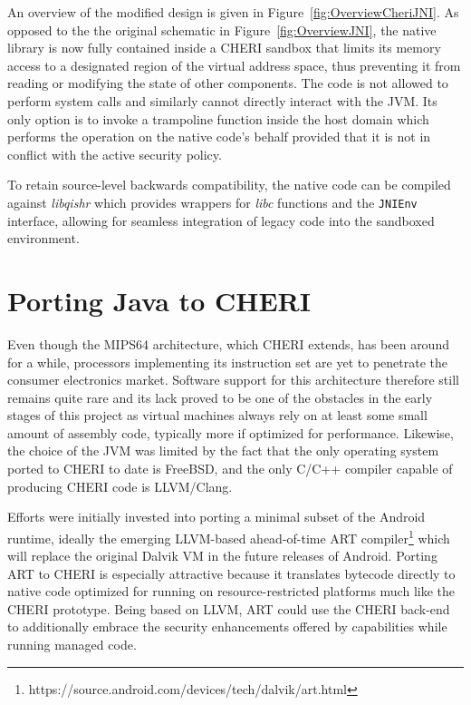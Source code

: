 \documentclass[a4paper,12pt,twoside,openright]{report}
\newcommand{\tool}[1]{\emph{#1}}
\newcommand{\lib}[1]{\tool{lib#1}}
\begin{document}
An overview of the modified design is given in Figure~\ref{fig:OverviewCheriJNI}. As opposed to the the original schematic in Figure~\ref{fig:OverviewJNI}, the native library is now fully contained inside a CHERI sandbox that limits its memory access to a designated region of the virtual address space, thus preventing it from reading or modifying the state of other components. The code is not allowed to perform system calls and similarly cannot directly interact with the JVM. Its only option is to invoke a trampoline function inside the host domain which performs the operation on the native code's behalf provided that it is not in conflict with the active security policy.

To retain source-level backwards compatibility, the native code can be compiled against \lib{qishr} which provides wrappers for \lib{c} functions and the \texttt{JNIEnv} interface, allowing for seamless integration of legacy code into the sandboxed environment.

\section{Porting Java to CHERI}

Even though the MIPS64 architecture, which CHERI extends, has been around for a while, processors implementing its instruction set are yet to penetrate the consumer electronics market. Software support for this architecture therefore still remains quite rare and its lack proved to be one of the obstacles in the early stages of this project as virtual machines always rely on at least some small amount of assembly code, typically more if optimized for performance. Likewise, the choice of the JVM was limited by the fact that the only operating system ported to CHERI to date is FreeBSD, and the only C/C++ compiler capable of producing CHERI code is LLVM/Clang. 

Efforts were initially invested into porting a minimal subset of the Android runtime, ideally the emerging LLVM-based ahead-of-time ART compiler\footnote{https://source.android.com/devices/tech/dalvik/art.html} which will replace the original Dalvik VM in the future releases of Android. Porting ART to CHERI is especially attractive because it translates bytecode directly to native code optimized for running on resource-restricted platforms much like the CHERI prototype. Being based on LLVM, ART could use the CHERI back-end to additionally embrace the security enhancements offered by capabilities while running managed code.
\end{document}

